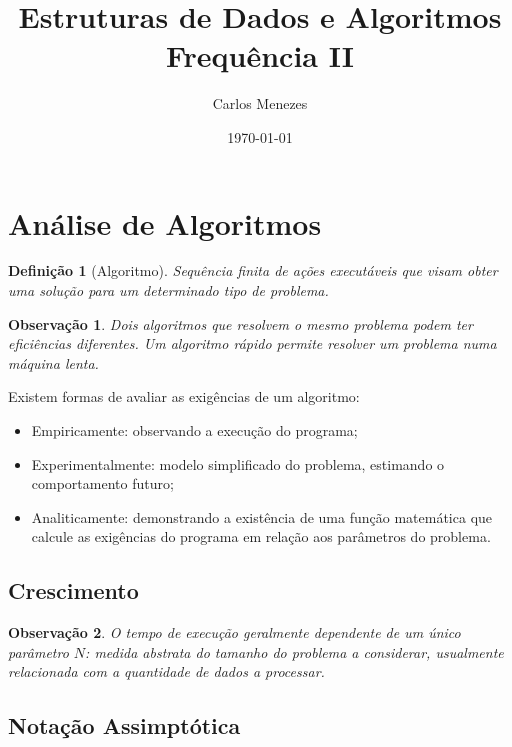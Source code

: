 \documentclass[a4paper, 12pt]{article}
\title{Estruturas de Dados e Algoritmos\\ \Large{Frequência II}}
\author{Carlos Menezes}
\date{\today}
\newtheorem{definition}{Definição}[section]
\newtheorem{remark}{Observação}
\begin{document}
\maketitle

\newpage

\tableofcontents

\newpage

\section{Análise de Algoritmos}

\begin{definition}[Algoritmo]
    Sequência finita de ações executáveis que visam obter uma solução para um determinado tipo de problema.
\end{definition}

\begin{remark}
    Dois algoritmos que resolvem o mesmo problema podem ter eficiências diferentes. Um algoritmo rápido permite resolver um problema numa máquina lenta.
\end{remark}

Existem formas de avaliar as exigências de um algoritmo:
\begin{itemize}
    \item Empiricamente: observando a execução do programa;
    \item Experimentalmente: modelo simplificado do problema, estimando o comportamento futuro;
    \item Analiticamente: demonstrando a existência de uma função matemática que calcule as exigências do programa em relação aos parâmetros do problema.
\end{itemize}

\subsection{Crescimento}

\begin{remark}
    O tempo de execução geralmente dependente de um único parâmetro $N$: medida abstrata do tamanho do problema a considerar, usualmente relacionada com a quantidade de dados a processar.
\end{remark}

\newpage

\subsection{Notação Assimptótica}
\end{document}
